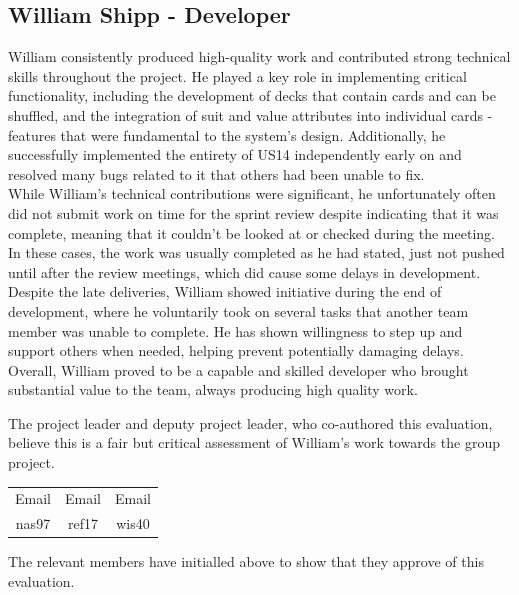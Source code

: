 \documentclass[a4paper]{project}
\begin{document}
		\subsection{William Shipp - Developer}\label{subsec:performance-william-shipp}
		
			William consistently produced high-quality work and contributed strong technical skills throughout the project. He played a key role in implementing critical functionality, including the development of decks that contain cards and can be shuffled, and the integration of suit and value attributes into individual cards - features that were fundamental to the system's design. Additionally, he successfully implemented the entirety of US14 independently early on and resolved many bugs related to it that others had been unable to fix. \\
			While William’s technical contributions were significant, he unfortunately often did not submit work on time for the sprint review despite indicating that it was complete, meaning that it couldn’t be looked at or checked during the meeting. In these cases, the work was usually completed as he had stated, just not pushed until after the review meetings, which did cause some delays in development. \\
			Despite the late deliveries, William showed initiative during the end of development, where he voluntarily took on several tasks that another team member was unable to complete. He has shown willingness to step up and support others when needed, helping prevent potentially damaging delays. \\
			Overall, William proved to be a capable and skilled developer who brought substantial value to the team, always producing high quality work.
		
			The project leader and deputy project leader, who co-authored this evaluation, believe this is a fair but critical assessment of William's work towards the group project.
			
			\begin{center}
				\setlength{\tabcolsep}{0.05\paperwidth}
				\begin{tabular}{c c c}
					Email & Email & Email  \\
					nas97 & ref17 & wis40
				\end{tabular}
			\end{center}
			
			The relevant members have initialled above to show that they approve of this evaluation.
\end{document}

